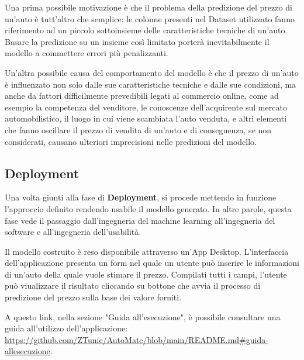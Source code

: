 Una prima possibile motivazione è che il problema della predizione del prezzo di un'auto è tutt'altro che semplice: le colonne presenti nel Dataset utilizzato fanno riferimento ad un piccolo sottoinsieme delle caratteristiche tecniche di un'auto. Basare la predizione su un insieme così limitato porterà inevitabilmente il modello a commettere errori più penalizzanti.

\medskip
Un'altra possibile causa del comportamento del modello è che il prezzo di un'auto è influenzato non solo dalle sue caratteristiche tecniche e dalle sue condizioni, ma anche da fattori difficilmente prevedibili legati al commercio online, come ad esempio la competenza del venditore, le conoscenze dell'acquirente sul mercato automobilistico, il luogo in cui viene scambiata l'auto venduta, e altri elementi che fanno oscillare il prezzo di vendita di un'auto e di conseguenza, se non considerati, causano ulteriori imprecisioni nelle predizioni del modello.


\subsection{Deployment}
Una volta giunti alla fase di \textbf{Deployment}, si procede mettendo in funzione l'approccio definito rendendo usabile il modello generato. In altre parole, questa fase vede il passaggio dall'ingegneria del machine learning all'ingegneria del software e all'ingegneria dell'usabilità.

Il modello costruito è reso disponibile attraverso un'App Desktop. L'interfaccia dell'applicazione presenta un form nel quale un utente può inserire le informazioni di un'auto della quale vuole stimare il prezzo. Compilati tutti i campi, l'utente può viualizzare il risultato cliccando su bottone che avvia il processo di predizione del prezzo sulla base dei valore forniti.

A questo link, nella sezione "Guida all'esecuzione", è possibile consultare una guida all'utilizzo dell'applicazione: \textcolor{blue}{\url{https://github.com/ZTunic/AutoMate/blob/main/README.md\#guida-allesecuzione}}.